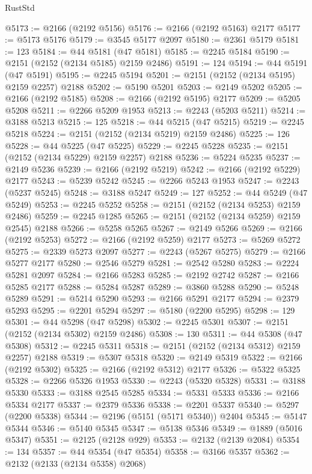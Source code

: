\begin{lexlean}{RustStd}
\begin{coremodule}
@5173 := @2166 (@2192 @5156)
@5176 := @2166 (@2192 @5163) @2177
@5177 := @5173 @5176
@5179 := @3545 @5177 @2097
@5180 := @2361 @5179
@5181 := 123
@5184 := @44 @5181 (@47 @5181)
@5185 := @2245 @5184
@5190 := @2151 (@2152 (@2134 @5185) @2159 @2486)
@5191 := 124
@5194 := @44 @5191 (@47 @5191)
@5195 := @2245 @5194
@5201 := @2151 (@2152 (@2134 @5195) @2159 @2257) @2188
@5202 := @5190 @5201
@5203 := @2149 @5202
@5205 := @2166 (@2192 @5185)
@5208 := @2166 (@2192 @5195) @2177
@5209 := @5205 @5208
@5211 := @2266 @5209 @1953
@5213 := @2243 (@5203 @5211)
@5214 := @3188 @5213
@5215 := 125
@5218 := @44 @5215 (@47 @5215)
@5219 := @2245 @5218
@5224 := @2151 (@2152 (@2134 @5219) @2159 @2486)
@5225 := 126
@5228 := @44 @5225 (@47 @5225)
@5229 := @2245 @5228
@5235 := @2151 (@2152 (@2134 @5229) @2159 @2257) @2188
@5236 := @5224 @5235
@5237 := @2149 @5236
@5239 := @2166 (@2192 @5219)
@5242 := @2166 (@2192 @5229) @2177
@5243 := @5239 @5242
@5245 := @2266 @5243 @1953
@5247 := @2243 (@5237 @5245)
@5248 := @3188 @5247
@5249 := 127
@5252 := @44 @5249 (@47 @5249)
@5253 := @2245 @5252
@5258 := @2151 (@2152 (@2134 @5253) @2159 @2486)
@5259 := @2245 @1285
@5265 := @2151 (@2152 (@2134 @5259) @2159 @2545) @2188
@5266 := @5258 @5265
@5267 := @2149 @5266
@5269 := @2166 (@2192 @5253)
@5272 := @2166 (@2192 @5259) @2177
@5273 := @5269 @5272
@5275 := @2339 @5273 @2097
@5277 := @2243 (@5267 @5275)
@5279 := @2166 @5277 @2177
@5280 := @2546 @5279
@5281 := @2542 @5280
@5283 := @2224 @5281 @2097
@5284 := @2166 @5283
@5285 := @2192 @2742
@5287 := @2166 @5285 @2177
@5288 := @5284 @5287
@5289 := @3860 @5288
@5290 := @5248 @5289
@5291 := @5214 @5290
@5293 := @2166 @5291 @2177
@5294 := @2379 @5293
@5295 := @2201 @5294
@5297 := @5180 (@2200 @5295)
@5298 := 129
@5301 := @44 @5298 (@47 @5298)
@5302 := @2245 @5301
@5307 := @2151 (@2152 (@2134 @5302) @2159 @2486)
@5308 := 130
@5311 := @44 @5308 (@47 @5308)
@5312 := @2245 @5311
@5318 := @2151 (@2152 (@2134 @5312) @2159 @2257) @2188
@5319 := @5307 @5318
@5320 := @2149 @5319
@5322 := @2166 (@2192 @5302)
@5325 := @2166 (@2192 @5312) @2177
@5326 := @5322 @5325
@5328 := @2266 @5326 @1953
@5330 := @2243 (@5320 @5328)
@5331 := @3188 @5330
@5333 := @3188 @2545 @5285
@5334 := @5331 @5333
@5336 := @2166 @5334 @2177
@5337 := @2379 @5336
@5338 := @2201 @5337
@5340 := @5297 (@2200 @5338)
@5344 := @2196 (@5151 (@5171 @5340)) @2404
@5345 := @5147 @5344
@5346 := @5140 @5345
@5347 := @5138 @5346
@5349 := @1889 (@5016 @5347)
@5351 := @2125 (@2128 @929)
@5353 := @2132 (@2139 @2084)
@5354 := 134
@5357 := @44 @5354 (@47 @5354)
@5358 := @3166 @5357
@5362 := @2132 (@2133 (@2134 @5358) @2068)

\end{coremodule}
\end{lexlean}
